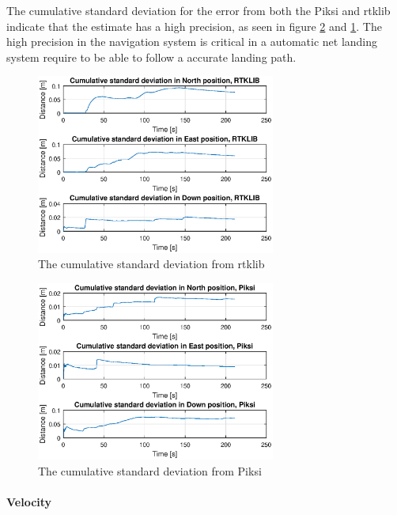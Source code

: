 The cumulative standard deviation for the error from both the Piksi and \gls{rtklib} indicate that the estimate has a high precision, as seen in figure \ref{figure:stdPiksi} and \ref{figure:stdRTK}. The high precision in the navigation system is critical in a automatic net landing system require to be able to follow a accurate landing path.
\begin{figure}[H]
	\centering
		\includegraphics[width=0.7\textwidth]{figs/plots/stdRtklibWalk1.eps}
		\caption{The cumulative standard deviation from \gls{rtklib}}
		\label{figure:stdRTK}
\end{figure}
\begin{figure}[H]
	\centering
		\includegraphics[width=0.7\textwidth]{figs/plots/stdPiksiWalk1.eps}
		\caption{The cumulative standard deviation from Piksi}
		\label{figure:stdPiksi}
\end{figure}
\paragraph{Velocity}~\\


